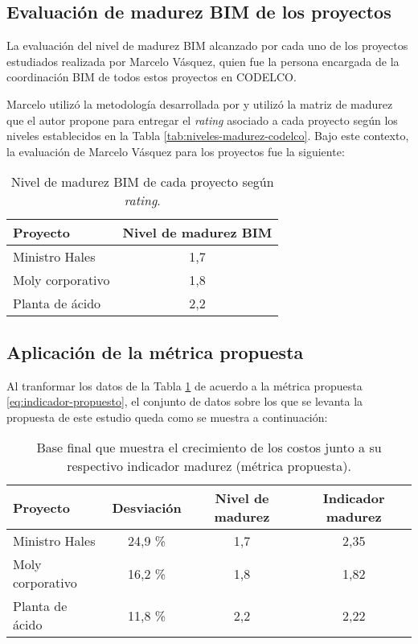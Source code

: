 \subsection{Evaluación de madurez BIM de los proyectos}

La evaluación del nivel de madurez BIM alcanzado por cada uno de los proyectos estudiados realizada por Marcelo Vásquez, quien fue la persona encargada de la coordinación BIM de todos estos proyectos en CODELCO.

Marcelo utilizó la metodología desarrollada por  y utilizó la matriz de madurez que el autor propone para entregar el \emph{rating} asociado a cada proyecto según los niveles establecidos en la Tabla \ref{tab:niveles-madurez-codelco}. Bajo este contexto, la evaluación de Marcelo Vásquez para los proyectos fue la siguiente:

\begin{table}[H]
    \centering
    \caption{Nivel de madurez BIM de cada proyecto según \emph{rating}.}
    \label{tab:evaluacionmadurez}
    \begin{tabular}{lc}
        \toprule 
        \textbf{Proyecto} & \textbf{Nivel de madurez BIM} \\
        \midrule
        Ministro Hales   & 1,7 \\
        Moly corporativo & 1,8 \\
        Planta de ácido  & 2,2 \\
        \bottomrule
    \end{tabular}
\end{table}

\subsection{Aplicación de la métrica propuesta}

Al tranformar los datos de la Tabla \ref{tab:evaluacionmadurez} de acuerdo a la métrica propuesta \eqref{eq:indicador-propuesto}, el conjunto de datos sobre los que se levanta la propuesta de este estudio queda como se muestra a continuación:

\begin{table}[H]
    \centering
    \caption{Base final que muestra el crecimiento de los costos junto a su respectivo indicador madurez (métrica propuesta).}
    \label{tab:datosfinales}
    \begin{tabular}{lccc}
        \toprule 
        \textbf{Proyecto}  & \textbf{Desviación} & \textbf{Nivel de madurez} & \textbf{Indicador madurez} \\
        \midrule
        Ministro Hales     & 24,9 \%             & 1,7                       & 2,35 \\
        Moly corporativo   & 16,2 \%             & 1,8                       & 1,82 \\
        Planta de ácido    & 11,8 \%             & 2,2                       & 2,22 \\
        \bottomrule
    \end{tabular}
\end{table}


